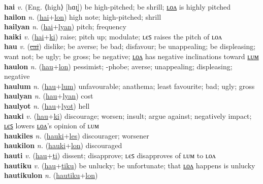 \textbf{hai} \textit{v.} (Eng. ⟨high⟩ [hɑɪ̯])
be high-pitched; be shrill; \hyperref[hailon]{ʟᴏᴧ} is highly pitched \label{hai} \\
\textbf{hailon} \textit{n.} (\hyperref[hai]{hai}+\hyperref[lon]{lon})
high note; high-pitched; shrill \label{hailon} \\
\textbf{hailyan} \textit{n.} (\hyperref[hai]{hai}+\hyperref[lyan]{lyan})
pitch; frequency \label{hailyan} \\
\textbf{haiki} \textit{v.} (\hyperref[hai]{hai}+\hyperref[ki]{ki})
raise; pitch up; modulate; ʟєꜱ raises the pitch of ʟᴏᴧ \label{haiki} \\
\textbf{hau} \textit{v.} (\hyperref[cai]{\sout{cai}})
dislike; be averse; be bad; disfavour; be unappealing; be displeasing; want not; be ugly; be gross; be negative; \hyperref[haulon]{ʟᴏᴧ} has negative inclinations toward \hyperref[haulum]{ʟᴜᴍ} \label{hau} \\
\textbf{haulon} \textit{n.} (\hyperref[hau]{hau}+\hyperref[lon]{lon})
pessimist; -phobe; averse; unappealing; displeasing; negative \label{haulon} \\
\textbf{haulum} \textit{n.} (\hyperref[hau]{hau}+\hyperref[lum]{lum})
unfavourable; anathema; least favourite; bad; ugly; gross \label{haulum} \\
\textbf{haulyan} \textit{n.} (\hyperref[hau]{hau}+\hyperref[lyan]{lyan})
cost \label{haulyan} \\
\textbf{haulyot} \textit{n.} (\hyperref[hau]{hau}+\hyperref[lyot]{lyot})
hell \label{haulyot} \\
\textbf{hauki} \textit{v.} (\hyperref[hau]{hau}+\hyperref[ki]{ki})
discourage; worsen; insult; argue against; negatively impact; \hyperref[haukiles]{ʟєꜱ} lowers \hyperref[haukilon]{ʟᴏᴧ}’s opinion of ʟᴜᴍ \label{hauki} \\
\textbf{haukiles} \textit{n.} (\hyperref[hauki]{hauki}+\hyperref[les]{les})
discourager; worsener \label{haukiles} \\
\textbf{haukilon} \textit{n.} (\hyperref[hauki]{hauki}+\hyperref[lon]{lon})
discouraged \label{haukilon} \\
\textbf{hauti} \textit{v.} (\hyperref[hau]{hau}+\hyperref[ti]{ti})
dissent; disapprove; ʟєꜱ disapproves of ʟᴜᴍ to ʟᴏᴧ \label{hauti} \\
\textbf{hautiku} \textit{v.} (\hyperref[hau]{hau}+\hyperref[tiku]{tiku})
be unlucky; be unfortunate; that \hyperref[hautikulon]{ʟᴏᴧ} happens is unlucky \label{hautiku} \\
\textbf{hautikulon} \textit{n.} (\hyperref[hautiku]{hautiku}+\hyperref[lon]{lon})
